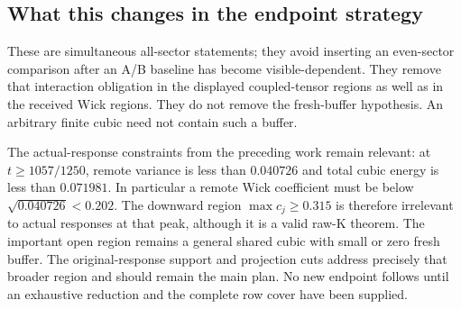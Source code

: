 \subsection{What this changes in the endpoint strategy}
These are simultaneous all-sector statements; they avoid inserting an
even-sector comparison after an A/B baseline has become visible-dependent.
They remove that interaction obligation in the displayed coupled-tensor
regions as well as in the received Wick regions.
They do not remove the fresh-buffer hypothesis. An arbitrary finite
cubic need not contain such a buffer.

The actual-response constraints from the preceding work remain relevant:
at $t\ge1057/1250$, remote variance is less than $0.040726$ and
total cubic energy is less than $0.071981$. In particular a remote
Wick coefficient must be below $\sqrt{0.040726}<0.202$.
The downward region $\max c_j\ge0.315$ is therefore irrelevant to
actual responses at that peak, although it is a valid raw-K theorem.
The important open region remains a general shared cubic with small or
zero fresh buffer. The original-response support and projection cuts
address precisely that broader region and should remain the main plan.
No new endpoint follows until an exhaustive reduction and the complete
row cover have been supplied.
